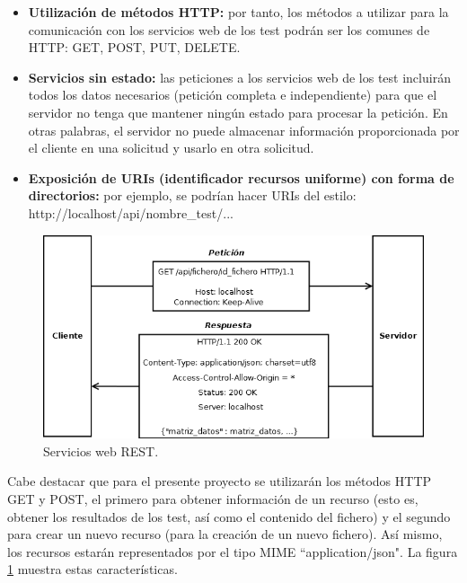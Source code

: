 \begin{itemize}
\item \textbf{Utilización de métodos HTTP:} por tanto, los métodos a utilizar para la comunicación con los servicios web de los test podrán ser los comunes de HTTP: GET, POST, PUT, DELETE.
\item \textbf{Servicios sin estado:} las peticiones a los servicios web de los test incluirán todos los datos necesarios (petición completa e independiente) para que el servidor no tenga que mantener ningún estado para procesar la petición. En otras palabras, el servidor no puede almacenar información proporcionada por el cliente en una solicitud y usarlo en otra solicitud.
\item \textbf{Exposición de URIs (identificador recursos uniforme) con forma de directorios:} por ejemplo, se podrían hacer URIs del estilo: http://localhost/api/nombre\_test/...
\end{itemize}

\begin{figure}[H]
\centering
\includegraphics[width=12cm,height=6cm]{figuras/rest.png}
\caption{Servicios web REST.}
\label{fig:rest}
\end{figure}

Cabe destacar que para el presente proyecto se utilizarán los métodos HTTP GET y POST, el primero para obtener información de un recurso (esto es, obtener los resultados de los test, así como el contenido del fichero) y el segundo para crear un nuevo recurso (para la creación de un nuevo fichero). Así mismo, los recursos estarán representados por el tipo MIME ``application/json". La figura \ref{fig:rest} muestra estas características.

